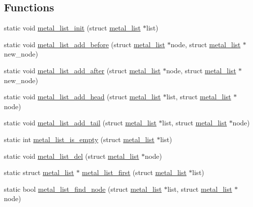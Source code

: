 \subsection*{Functions}
\begin{DoxyCompactItemize}
\item 
static void \hyperlink{group__list_gaf8597618255ce029073cca81cd30e9cd}{metal\+\_\+list\+\_\+init} (struct \hyperlink{structmetal__list}{metal\+\_\+list} $\ast$list)
\item 
static void \hyperlink{group__list_gac12417fb4a7c292beab5e66a3327e8a0}{metal\+\_\+list\+\_\+add\+\_\+before} (struct \hyperlink{structmetal__list}{metal\+\_\+list} $\ast$node, struct \hyperlink{structmetal__list}{metal\+\_\+list} $\ast$new\+\_\+node)
\item 
static void \hyperlink{group__list_ga1262a3c4164fe487f3cdbebbcbf54aa2}{metal\+\_\+list\+\_\+add\+\_\+after} (struct \hyperlink{structmetal__list}{metal\+\_\+list} $\ast$node, struct \hyperlink{structmetal__list}{metal\+\_\+list} $\ast$new\+\_\+node)
\item 
static void \hyperlink{group__list_ga4287ef3bbee0ddceb3d7628b75631cbb}{metal\+\_\+list\+\_\+add\+\_\+head} (struct \hyperlink{structmetal__list}{metal\+\_\+list} $\ast$list, struct \hyperlink{structmetal__list}{metal\+\_\+list} $\ast$node)
\item 
static void \hyperlink{group__list_ga000fe56567954bd8ab62ce8272b34181}{metal\+\_\+list\+\_\+add\+\_\+tail} (struct \hyperlink{structmetal__list}{metal\+\_\+list} $\ast$list, struct \hyperlink{structmetal__list}{metal\+\_\+list} $\ast$node)
\item 
static int \hyperlink{group__list_ga221c4e44f6777c335d5fc9040c3e82bf}{metal\+\_\+list\+\_\+is\+\_\+empty} (struct \hyperlink{structmetal__list}{metal\+\_\+list} $\ast$list)
\item 
static void \hyperlink{group__list_ga8984cf0b813ddb9ade85f4498435a2b3}{metal\+\_\+list\+\_\+del} (struct \hyperlink{structmetal__list}{metal\+\_\+list} $\ast$node)
\item 
static struct \hyperlink{structmetal__list}{metal\+\_\+list} $\ast$ \hyperlink{group__list_gae3c4f7b25d4d581290d183b0927d998c}{metal\+\_\+list\+\_\+first} (struct \hyperlink{structmetal__list}{metal\+\_\+list} $\ast$list)
\item 
static bool \hyperlink{group__list_gaffc577ede59f4ef9a539465e5d12a686}{metal\+\_\+list\+\_\+find\+\_\+node} (struct \hyperlink{structmetal__list}{metal\+\_\+list} $\ast$list, struct \hyperlink{structmetal__list}{metal\+\_\+list} $\ast$node)
\end{DoxyCompactItemize}


